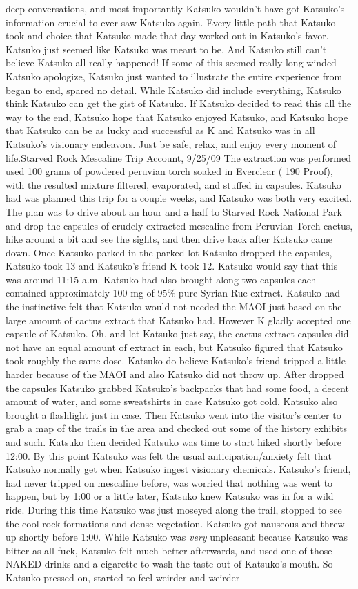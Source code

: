 \documentclass[12pt]{book}
\begin{document}
deep conversations, and most importantly Katsuko wouldn't have got Katsuko's information crucial to ever saw Katsuko again. Every little path that Katsuko took and choice that Katsuko made that day worked out in Katsuko's favor. Katsuko just seemed like Katsuko was meant to be. And Katsuko still can't believe Katsuko all really happened! If some of this seemed really long-winded Katsuko apologize, Katsuko just wanted to illustrate the entire experience from began to end, spared no detail. While Katsuko did include everything, Katsuko think Katsuko can get the gist of Katsuko. If Katsuko decided to read this all the way to the end, Katsuko hope that Katsuko enjoyed Katsuko, and Katsuko hope that Katsuko can be as lucky and successful as K and Katsuko was in all Katsuko's visionary endeavors. Just be safe, relax, and enjoy every moment of life.Starved Rock Mescaline Trip Account, 9/25/09 The extraction was performed used 100 grams of powdered peruvian torch soaked in Everclear ( 190 Proof), with the resulted mixture filtered, evaporated, and stuffed in capsules. Katsuko had was planned this trip for a couple weeks, and Katsuko was both very excited. The plan was to drive about an hour and a half to Starved Rock National Park and drop the capsules of crudely extracted mescaline from Peruvian Torch cactus, hike around a bit and see the sights, and then drive back after Katsuko came down. Once Katsuko parked in the parked lot Katsuko dropped the capsules, Katsuko took 13 and Katsuko's friend K took 12. Katsuko would say that this was around 11:15 a.m. Katsuko had also brought along two capsules each contained approximately 100 mg of 95\% pure Syrian Rue extract. Katsuko had the instinctive felt that Katsuko would not needed the MAOI just based on the large amount of cactus extract that Katsuko had. However K gladly accepted one capsule of Katsuko. Oh, and let Katsuko just say, the cactus extract capsules did not have an equal amount of extract in each, but Katsuko figured that Katsuko took roughly the same dose. Katsuko do believe Katsuko's friend tripped a little harder because of the MAOI and also Katsuko did not throw up. After dropped the capsules Katsuko grabbed Katsuko's backpacks that had some food, a decent amount of water, and some sweatshirts in case Katsuko got cold. Katsuko also brought a flashlight just in case. Then Katsuko went into the visitor's center to grab a map of the trails in the area and checked out some of the history exhibits and such. Katsuko then decided Katsuko was time to start hiked shortly before 12:00. By this point Katsuko was felt the usual anticipation/anxiety felt that Katsuko normally get when Katsuko ingest visionary chemicals. Katsuko's friend, had never tripped on mescaline before, was worried that nothing was went to happen, but by 1:00 or a little later, Katsuko knew Katsuko was in for a wild ride. During this time Katsuko was just moseyed along the trail, stopped to see the cool rock formations and dense vegetation. Katsuko got nauseous and threw up shortly before 1:00. While Katsuko was \emph{very} unpleasant because Katsuko was bitter as all fuck, Katsuko felt much better afterwards, and used one of those NAKED drinks and a cigarette to wash the taste out of Katsuko's mouth. So Katsuko pressed on, started to feel weirder and weirder 
\end{document}
